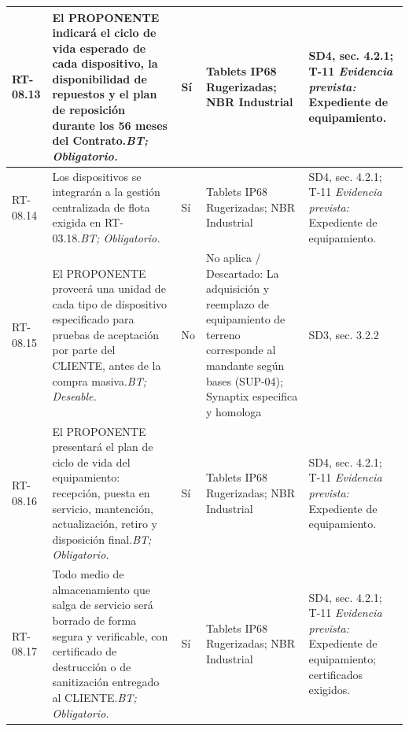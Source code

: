 \begin{paginaHorizontalSynaptix}
\begin{longtable}{|L{0.09\AnchoMatrizTDoce}|L{0.385\AnchoMatrizTDoce}|L{0.065\AnchoMatrizTDoce}|L{0.18\AnchoMatrizTDoce}|L{0.28\AnchoMatrizTDoce}|}
RT-\allowbreak{}08.\allowbreak{}13 &
El PROPONENTE indicará el ciclo de vida esperado de cada dispositivo, la disponibilidad de repuestos y el plan de reposición durante los 56 meses del Contrato.\newline\textit{BT; Obligatorio.} &
Sí &
Tablets IP68 Rugerizadas; NBR Industrial &
SD4, sec. 4.2.1; T-11 \newline\textit{Evidencia prevista:} Expediente de equipamiento. \\ \hline

RT-\allowbreak{}08.\allowbreak{}14 &
Los dispositivos se integrarán a la gestión centralizada de flota exigida en RT-03.18.\newline\textit{BT; Obligatorio.} &
Sí &
Tablets IP68 Rugerizadas; NBR Industrial &
SD4, sec. 4.2.1; T-11 \newline\textit{Evidencia prevista:} Expediente de equipamiento. \\ \hline

RT-\allowbreak{}08.\allowbreak{}15 &
El PROPONENTE proveerá una unidad de cada tipo de dispositivo especificado para pruebas de aceptación por parte del CLIENTE, antes de la compra masiva.\newline\textit{BT; Deseable.} &
No &
No aplica / Descartado: La adquisición y reemplazo de equipamiento de terreno corresponde al mandante según bases (SUP-04); Synaptix especifica y homologa &
SD3, sec. 3.2.2 \\ \hline

RT-\allowbreak{}08.\allowbreak{}16 &
El PROPONENTE presentará el plan de ciclo de vida del equipamiento: recepción, puesta en servicio, mantención, actualización, retiro y disposición final.\newline\textit{BT; Obligatorio.} &
Sí &
Tablets IP68 Rugerizadas; NBR Industrial &
SD4, sec. 4.2.1; T-11 \newline\textit{Evidencia prevista:} Expediente de equipamiento. \\ \hline

RT-\allowbreak{}08.\allowbreak{}17 &
Todo medio de almacenamiento que salga de servicio será borrado de forma segura y verificable, con certificado de destrucción o de sanitización entregado al CLIENTE.\newline\textit{BT; Obligatorio.} &
Sí &
Tablets IP68 Rugerizadas; NBR Industrial &
SD4, sec. 4.2.1; T-11 \newline\textit{Evidencia prevista:} Expediente de equipamiento; certificados exigidos. \\ \hline


\end{longtable}
\end{paginaHorizontalSynaptix}
